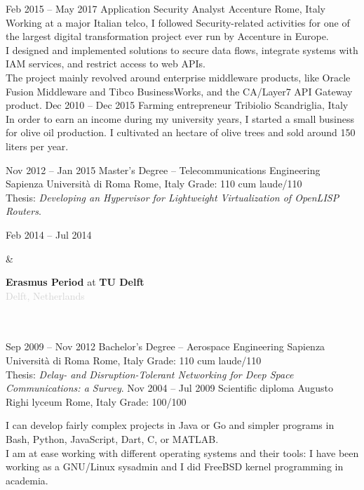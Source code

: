 \documentclass[9pt]{developercv}
\begin{document}
\begin{entrylist}
{		}
	\entry
		{Feb 2015 -- May 2017}
		{Application Security Analyst}
		{Accenture}
		{Rome, Italy}
		{
			Working at a major Italian telco, I followed Security-related activities for one of the largest digital transformation project ever run by Accenture in Europe.
			\\
			I designed and implemented solutions to secure data flows, integrate systems with IAM services, and restrict access to web APIs.
			\\
			The project mainly revolved around enterprise middleware products, like Oracle Fusion Middleware and Tibco BusinessWorks, and the CA/Layer7 API Gateway product.
		}
	\entry
		{Dec 2010 -- Dec 2015}
		{Farming entrepreneur}
		{Tribiolio}
		{Scandriglia, Italy}
		{
			In order to earn an income during my university years, I started a small business for olive oil production. I cultivated an hectare of olive trees and sold around 150 liters per year.
		}
\end{entrylist}


\begin{entrylist}
	\entry
		{Nov 2012 -- Jan 2015}
		{Master’s Degree -- Telecommunications Engineering}
		{Sapienza Università di Roma}
		{Rome, Italy}
		{
			Grade: 110 cum laude/110
			\\
			Thesis: \textit{Developing an Hypervisor for Lightweight Virtualization of OpenLISP Routers}.
		}
		\parbox[t]{0.2\textwidth}{
			Feb 2014 -- Jul 2014
		}
		&\parbox[t]{0.8\textwidth}{
			\textbf{Erasmus Period} at \textbf{TU Delft}
			\\
			\textcolor{lightgrey}{Delft, Netherlands}
		}\\\\
	\entry
		{Sep 2009 -- Nov 2012}
		{Bachelor’s Degree -- Aerospace Engineering}
		{Sapienza Università di Roma}
		{Rome, Italy}
		{
			Grade: 110 cum laude/110
			\\
			Thesis: \textit{Delay- and Disruption-Tolerant Networking for Deep Space Communications: a Survey}.
		}
	\entry
		{Nov 2004 -- Jul 2009}
		{Scientific diploma}
		{Augusto Righi lyceum}
		{Rome, Italy}
		{Grade: 100/100}
\end{entrylist}


\begin{minipage}[t]{1\textwidth}
	\vspace{-\baselineskip}
	I can develop fairly complex projects in Java or Go and simpler programs in Bash, Python, JavaScript, Dart, C, or MATLAB.
	\\
	I am at ease working with different operating systems and their tools: I have been working as a GNU/Linux sysadmin and I did FreeBSD kernel programming in academia.
\end{minipage}
\end{document}

